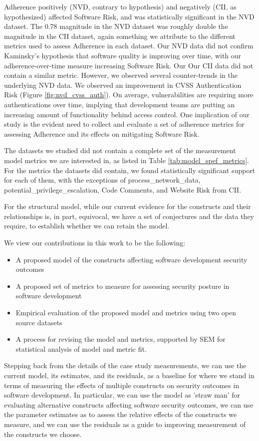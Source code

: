 Adherence positively (NVD, contrary to hypothesis) and negatively (CII, as hypothesized) affected Software Risk, and was statistically significant in the NVD dataset. The 0.78 magnitude in the NVD dataset was roughly double the magnitude in the CII dataset, again something we attribute to the different metrics used to assess Adherence in each dataset. Our NVD data did not confirm Kaminsky's hypothesis that software quality is improving over time, with our adherence-over-time measure increasing Software Risk. Our Our CII data did not contain a similar metric. However, we observed several counter-trends in the underlying NVD data. We observed an improvement in CVSS Authentication Risk (Figure \ref{fig:nvd_cvss_auth}). On average, vulnerabilities are requiring more authentications over time, implying that development teams are putting an increasing amount of functionality behind access control. One implication of our study is the evident need to collect and evaluate a set of adherence metrics for assessing Adherence and its effects on mitigating Software Risk.

The datasets we studied did not contain a complete set of the measurement model metrics we are interested in, as listed in Table \ref{tab:model_spef_metrics}. For the metrics the datasets did contain, we found statistically significant support for each of them, with the exceptions of process\_network\_data, potential\_privilege\_escalation, Code Comments, and Website Risk from CII. 

For the structural model, while our current evidence for the constructs and their relationships is, in part, equivocal, we have a set of conjectures and the data they require, to establish whether we can retain the model. 

We view our contributions in this work to be the following:
\begin{itemize}
	\item A proposed model of the constructs affecting software development security outcomes
	\item A proposed set of metrics to measure for assessing security posture in software development
	\item Empirical evaluation of the proposed model and metrics using two open source datasets
	\item A process for revising the model and metrics, supported by SEM for statistical analysis of model and metric fit. 
\end{itemize}	

Stepping back from the details of the case study measurements, we can use the current model, its estimates, and its residuals, as a baseline for where we stand in terms of measuring the effects of multiple constructs on security outcomes in software development. In particular, we can use the model as 'straw man' for evaluating alternative constructs affecting software security outcomes, we can use the parameter estimates as to assess the relative effects of the constructs we measure, and we can use the residuals as a guide to improving measurement of the constructs we choose. 


